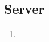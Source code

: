 \subsection*{Server}

\begin{samepage}
    \begin{enumerate}[label=\textbf{/NFZ\arabic*0/}, align=left, start=3]
        \item %
    \end{enumerate}
\end{samepage}
